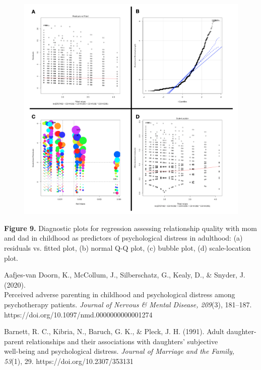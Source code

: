 \documentclass[12pt,letterpaper]{article}
\begin{document}
\begin{figure}[H]
	\centering
	\includegraphics[scale=0.4]{reg3_asps.png}
\end{figure}

\begin{center}
	\singlespacing
	\textbf{Figure 9.} Diagnostic plots for regression assessing relationship quality with mom and dad in childhood as predictors of psychological distress in adulthood: (a) residuals vs. fitted plot, (b) normal Q-Q plot, (c) bubble plot, (d) scale-location plot.
\end{center}

\pagebreak
\begin{center}
\end{center}

\noindent Aafjes-van Doorn, K., McCollum, J., Silberschatz, G., Kealy, D., \& Snyder, J. (2020).  \\
\indent Perceived adverse parenting in childhood and psychological distress among \\
\indent  psychotherapy patients. \textit{Journal of Nervous \& Mental Disease, 209}(3), 181–187. \\
\indent https://doi.org/10.1097/nmd.0000000000001274

\noindent Barnett, R. C., Kibria, N., Baruch, G. K., \& Pleck, J. H. (1991). Adult daughter- \\
\indent parent relationships and their associations with daughters' subjective \\
\indent well-being and psychological distress. \textit{Journal of Marriage and the Family,} \\ 
\indent \textit{53}(1), 29. https://doi.org/10.2307/353131
\end{document}

